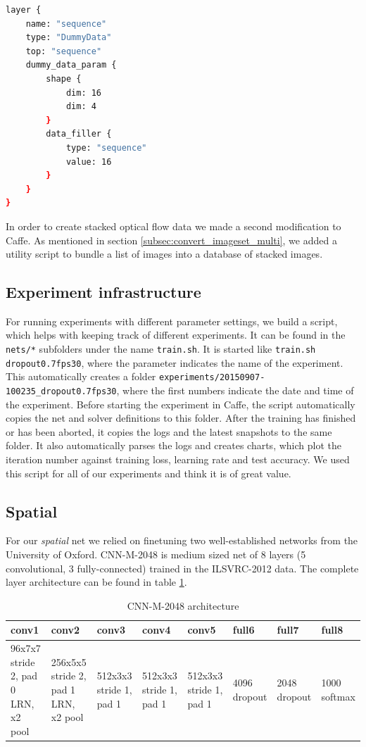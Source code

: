 \begin{lstlisting}[language=sh, caption=Sequence Layer, label=lst:seq-layer]
layer {
	name: "sequence"
	type: "DummyData"
	top: "sequence"
	dummy_data_param {
		shape {
			dim: 16
			dim: 4
		}
		data_filler {
			type: "sequence"
			value: 16
		}
	}
}
\end{lstlisting}

In order to create stacked optical flow data we made a second modification to Caffe.
As mentioned in section \ref{subsec:convert_imageset_multi}, we added a utility script to bundle a list of images into a database of stacked images.

\subsection{Experiment infrastructure}
For running experiments with different parameter settings, we build a script, which helps with keeping track of different experiments.
It can be found in the \texttt{nets/*} subfolders under the name \texttt{train.sh}.
It is started like \texttt{train.sh dropout0.7fps30}, where the parameter indicates the name of the experiment.
This automatically creates a folder \texttt{experiments/20150907-100235\_dropout0.7fps30}, where the first numbers indicate the date and time of the experiment.
Before starting the experiment in Caffe, the script automatically copies the net and solver definitions to this folder.
After the training has finished or has been aborted, it copies the logs and the latest snapshots to the same folder.
It also automatically parses the logs and creates charts, which plot the iteration number against training loss, learning rate and test accuracy.
We used this script for all of our experiments and think it is of great value.

\subsection{Spatial}
\label{subsec:spatial}
For our \emph{spatial} net we relied on finetuning two well-established networks from the University of Oxford.
CNN-M-2048 \cite{chatfield2014return} is medium sized net of 8 layers (5 convolutional, 3 fully-connected) trained in the ILSVRC-2012 data.
The complete layer architecture can be found in table \ref{table:cnn-m-208}.

\begin{table}[H]
\centering
\caption{CNN-M-2048 architecture}
\label{table:cnn-m-208}
\begin{tabularx}{\textwidth}{XXXXXXXX}
\toprule
conv1 & conv2 & conv3 & conv4 & conv5 & full6  & full7 & full8 \\ \midrule
96x7x7  stride 2, pad 0  LRN, x2 pool  &
256x5x5 stride 2, pad 1  LRN, x2 pool  &
512x3x3 stride 1, pad 1   &
512x3x3 stride 1, pad 1   &
512x3x3 stride 1, pad 1   &
4096  dropout  &
2048  dropout  &
1000  softmax  \\
\bottomrule
\end{tabularx}
\end{table}

